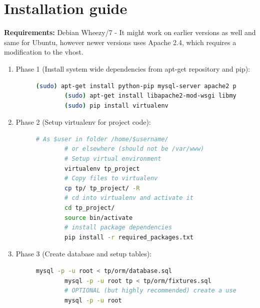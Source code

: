 \documentclass[10pt]{IEEEtran}
\begin{document}
\section{Installation guide}
\vspace*{10mm}
\begin{description}
	\item \textbf{Requirements:}  Debian Wheezy/7 - It might work on earlier versions as well and same for Ubuntu, however newer versions uses Apache 2.4, which requires a modification to the vhost.
\end{description} 
\vspace*{3mm}
\begin{enumerate}
	\item Phase 1 (Install system wide dependencies from apt-get repository and pip):
	\begin{figure}[h!]
	\vspace*{-2mm}	
	\begin{lstlisting}[language=bash]
		(sudo) apt-get install python-pip mysql-server apache2 python-dev
		(sudo) apt-get install libapache2-mod-wsgi libmysqlclient-dev
		(sudo) pip install virtualenv
	\end{lstlisting}
	\end{figure}
	\vspace*{-5mm}
	\item Phase 2 (Setup virtualenv for project code):
	\begin{figure}[h!]
	\vspace*{-2mm}	
	\begin{lstlisting}[language=bash]
		# As $user in folder /home/$username/ 
		# or elsewhere (should not be /var/www)		
		# Setup virtual environment
		virtualenv tp_project
		# Copy files to virtualenv 
		cp tp/ tp_project/ -R
		# cd into virtualenv and activate it
		cd tp_project/
		source bin/activate
		# install package dependencies
		pip install -r required_packages.txt
	\end{lstlisting}
	\end{figure}	
	\vspace*{-5mm}
	\item Phase 3 (Create database and setup tables):
	\begin{figure}[h!]
	\vspace*{-2mm}	
	\begin{lstlisting}[language=bash]
		mysql -p -u root < tp/orm/database.sql
		mysql -p -u root tp < tp/orm/fixtures.sql
		# OPTIONAL (but highly recommended) create a user for the application.
		mysql -p -u root

\end{lstlisting}
\end{figure}
\end{enumerate}
\end{document}
